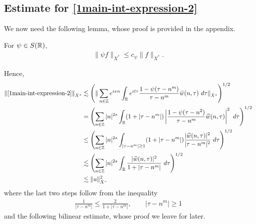 \subsection{Estimate for \eqref{1main-int-expression-2}}
We now need the following lemma, whose proof is provided in the appendix.
%
%
%
%
%
%
%
%
\begin{lemma}
\label{1lem:schwartz-mult}
	For $\psi \in S(\mathbb{R})$,
%
%
\begin{equation}
	\label{1schwartz-mult}
	\begin{split}
		\|\psi f \|_{\dot{X}^s} \le c_{\psi} \|f \|_{\dot{X}^s}.
	\end{split}
\end{equation}
%
%
\end{lemma}
%
%
Hence,
%
%
\begin{equation}
	\label{1main-int2-est-X-s-part}
	\begin{split}
		\|\eqref{1main-int-expression-2}\|_{\dot{X}^s} 
		& \lesssim 
		\left( \| \sum_{n \in \zz} e^{ixn} \int_\rr 
		e^{it \tau} \frac{ 1 - \psi (\tau - n^m ) 
		}{\tau - n^m} \wh{w}(n, \tau) \ 
		d \tau\|_{\dot{X}^s} \right)^{1/2}
		\\
		& =  \left( \sum_{n \in \zz} |n|^{2s} \int_\rr
		(1 + |\tau - n^m|) \left | \frac{1 - \psi(\tau - n^{2 
		})}{\tau - n^m} 
		\wh{w}(n, \tau) \right |^2 \ d 
		\tau \right)^{1/2}
		\\
		& \le \left( \sum_{n \in \zz} |n|^{2s} \int_{| \tau - n^m| \ge 1}
		(1 + |\tau - n^m|) \frac{|\wh{w}(n, \tau)|^2 }{|\tau - n^m|^2} 
		\ d 
		\tau \right)^{1/2}
		\\
		& \lesssim  \left( \sum_{n \in 
		\zz} |n|^{2s} \int_\rr
		\frac{|\wh{w}(n, \tau) |^2}{1+ |\tau - 
		n^m|} 
		 \ d \tau 
		\right)^{1/2}
		\\
		& \lesssim  \|u\|_{\dot{X}^s}^2
	\end{split}
\end{equation}
%
%
where the last two steps follow from the inequality 
%
\begin{equation}
	\label{1one-plus-ineq}
	\begin{split}
		\frac{1}{|\tau - n^m| } \le \frac{2}{1 + |\tau - n^m| }, 
		\qquad |\tau - n^m| \ge 1
	\end{split}
\end{equation}
%
%
and the following bilinear estimate, whose proof we leave for later.
%
